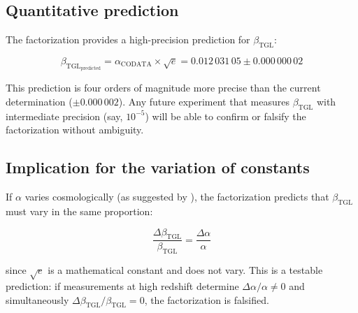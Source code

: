 \documentclass[12pt,a4paper,twoside]{article}
\newcommand{\betatgl}{\beta_{\!\scriptscriptstyle\mathrm{TGL}}}
\begin{document}
\subsection{Quantitative prediction}

The factorization provides a high-precision prediction for $\betatgl$:

\begin{equation}
\betatgl_{\text{predicted}} = \alpha_{\text{CODATA}} \times \sqrt{e} = 0.012\,031\,05 \pm 0.000\,000\,02
\end{equation}

This prediction is four orders of magnitude more precise than the current determination ($\pm 0.000\,002$). Any future experiment that measures $\betatgl$ with intermediate precision (say, $10^{-5}$) will be able to confirm or falsify the factorization without ambiguity.

\subsection{Implication for the variation of constants}

If $\alpha$ varies cosmologically (as suggested by \cite{Webb2001}), the factorization predicts that $\betatgl$ must vary in the same proportion:

\begin{equation}
\frac{\Delta\betatgl}{\betatgl} = \frac{\Delta\alpha}{\alpha}
\label{eq:variacao}
\end{equation}

\noindent since $\sqrt{e}$ is a mathematical constant and does not vary. This is a testable prediction: if measurements at high redshift determine $\Delta\alpha/\alpha \neq 0$ and simultaneously $\Delta\betatgl/\betatgl = 0$, the factorization is falsified.
\end{document}
